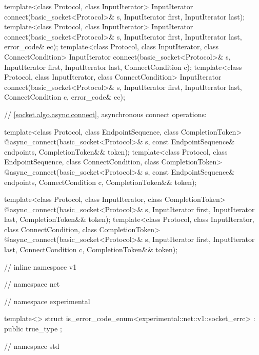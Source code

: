 \begin{codeblock}
{{{{  template<class Protocol, class InputIterator>
    InputIterator connect(basic_socket<Protocol>& s,
                          InputIterator first, InputIterator last);
  template<class Protocol, class InputIterator>
    InputIterator connect(basic_socket<Protocol>& s,
                          InputIterator first, InputIterator last,
                          error_code& ec);
  template<class Protocol, class InputIterator, class ConnectCondition>
    InputIterator connect(basic_socket<Protocol>& s,
                          InputIterator first, InputIterator last,
                          ConnectCondition c);
  template<class Protocol, class InputIterator, class ConnectCondition>
    InputIterator connect(basic_socket<Protocol>& s,
                          InputIterator first, InputIterator last,
                          ConnectCondition c,
                          error_code& ec);

  // \ref{socket.algo.async.connect}, asynchronous connect operations:

  template<class Protocol, class EndpointSequence, class CompletionToken>
    @\DEDUCED@ async_connect(basic_socket<Protocol>& s,
                          const EndpointSequence& endpoints,
                          CompletionToken&& token);
  template<class Protocol, class EndpointSequence, class ConnectCondition,
           class CompletionToken>
    @\DEDUCED@ async_connect(basic_socket<Protocol>& s,
                          const EndpointSequence& endpoints,
                          ConnectCondition c,
                          CompletionToken&& token);

  template<class Protocol, class InputIterator, class CompletionToken>
    @\DEDUCED@ async_connect(basic_socket<Protocol>& s,
                          InputIterator first, InputIterator last,
                          CompletionToken&& token);
  template<class Protocol, class InputIterator, class ConnectCondition,
           class CompletionToken>
    @\DEDUCED@ async_connect(basic_socket<Protocol>& s,
                          InputIterator first, InputIterator last,
                          ConnectCondition c,
                          CompletionToken&& token);

} // inline namespace v1
} // namespace net
} // namespace experimental

  template<> struct is_error_code_enum<experimental::net::v1::socket_errc>
    : public true_type {};

} // namespace std
\end{codeblock}

